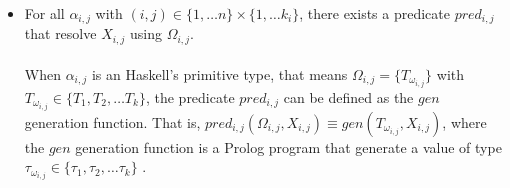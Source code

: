 \documentclass{report}
\theoremstyle{definition}
\newtheorem{example}{Example}[section]
\theoremstyle{definition}
\newcommand{\ttt}[1]{\texttt{#1}}
\begin{document}
\begin{itemize}
\begin{example}
\begin{itemize}
			\item As $\; \ttt{Weird} \;$ constructor requires both types \ttt{SomethingWeird Int String Bool} and  \ttt{String}, that is, $\alpha_{3,1} = \ttt{SomethingWeird Int String Bool}$ and $\alpha_{3,2} = \ttt{String}$, therefore $\Omega_{3,1} = \{\ttt{int}, \ttt{string}, \ttt{bool}\} \subseteq \{\ttt{int}, \ttt{string}, \ttt{bool}\}$ and $\Omega_{3,2} = \{\ttt{string}\} \subset \{\ttt{int}, \ttt{string}, \ttt{bool}\}$.
		\end{itemize}
	\end{example}
	\item For all $\alpha_{i,j}$ with $(i,j) \in \{1, \ldots n \} \times \{1, \ldots k_i \}$, there exists a predicate $pred_{i,j}$ that resolve $X_{i,j}$ using $\Omega_{i,j}$.\\\\
	When $\alpha_{i,j}$ is an Haskell's primitive type, that means $\Omega_{i,j} = \{T_{\omega_{i,j}}\}$ with $T_{\omega_{i,j}} \in \{ T_1 , T_2, \ldots T_k \}$, the predicate $pred_{i,j}$ can be defined as the $gen$ generation function. That is, $pred_{i,j}(\Omega_{i,j}, X_{i,j}) \equiv gen(T_{\omega_{i,j}}, X_{i,j})$, where the $gen$ generation function is a Prolog program that generate a value of type $\tau_{\omega_{i,j}} \in \{ \tau_1 , \tau_2, \ldots \tau_k \}$ .

\end{itemize}
\end{document}
